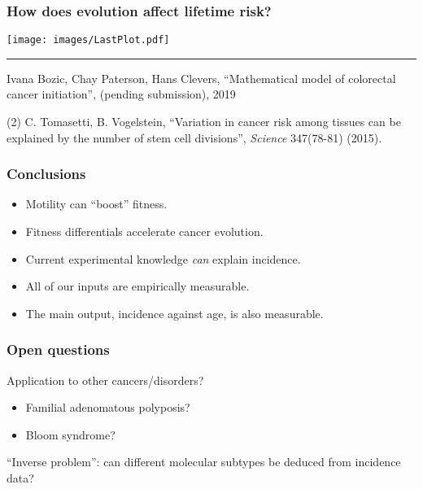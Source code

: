 \documentclass{beamer}
\begin{document}
\begin{frame}
    \frametitle{How does evolution affect lifetime risk?}

    \begin{center}
    \texttt{[image: images/LastPlot.pdf]}
    \end{center}

    \;
    \hrule
    \;

    \tiny{Ivana Bozic\*, Chay Paterson, Hans Clevers, ``Mathematical model of
    colorectal cancer initiation'', (pending submission), 2019}

    \tiny{(2) C. Tomasetti, B. Vogelstein, ``Variation in cancer risk among
    tissues can be explained by the number of stem cell divisions'',
    \emph{Science} 347(78-81) (2015).}
\end{frame}

\begin{frame}
\frametitle{Conclusions}
    \begin{itemize}
        \item Motility can ``boost'' fitness.
        \item Fitness differentials accelerate cancer evolution.
        \item Current experimental knowledge \emph{can} explain incidence.
        \item All of our inputs are empirically measurable. 
        \item The main output, incidence against age, is also measurable.
    \end{itemize}
\end{frame}

\begin{frame}
    \frametitle{Open questions}
    Application to other cancers/disorders?
    \begin{itemize}
        \item Familial adenomatous polyposis?
        \item Bloom syndrome?
    \end{itemize}

    ``Inverse problem'': can different molecular subtypes be deduced from
    incidence data?
\end{frame}
\end{document}

